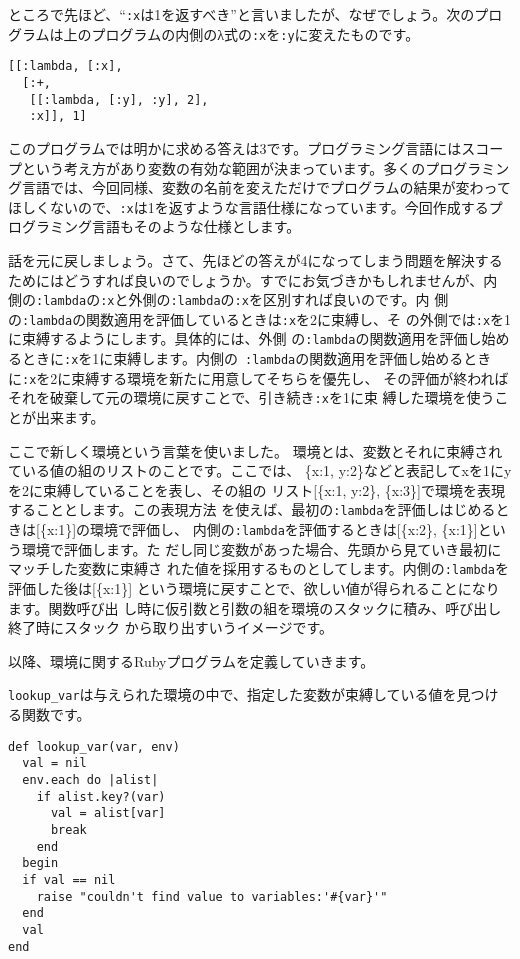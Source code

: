 ところで先ほど、“{\tt :x}は1を返すべき”と言いましたが、なぜでしょう。次のプログラムは上のプログラムの内側のλ式の{\tt :x}を{\tt :y}に変えたものです。

\begin{lstlisting}
[[:lambda, [:x],
  [:+, 
   [[:lambda, [:y], :y], 2],
   :x]], 1]
\end{lstlisting}

このプログラムでは明かに求める答えは3です。プログラミング言語にはスコープという考え方があり変数の有効な範囲が決まっています。多くのプログラミング言語では、今回同様、変数の名前を変えただけでプログラムの結果が変わってほしくないので、{\tt :x}は1を返すような言語仕様になっています。今回作成するプログラミング言語もそのような仕様とします。

話を元に戻しましょう。さて、先ほどの答えが4になってしまう問題を解決する
ためにはどうすれば良いのでしょうか。すでにお気づきかもしれませんが、内
側の{\tt :lambda}の{\tt :x}と外側の{\tt :lambda}の{\tt :x}を区別すれば良いのです。内
側の{\tt :lambda}の関数適用を評価しているときは{\tt :x}を2に束縛し、そ
の外側では{\tt :x}を1に束縛するようにします。具体的には、外側
の{\tt :lambda}の関数適用を評価し始めるときに{\tt :x}を1に束縛します。内側の{\tt
:lambda}の関数適用を評価し始めるときに{\tt :x}を2に束縛する環境を新たに用意してそちらを優先し、
その評価が終わればそれを破棄して元の環境に戻すことで、引き続き{\tt :x}を1に束
縛した環境を使うことが出来ます。

ここで新しく環境という言葉を使いました。
環境とは、変数とそれに束縛されている値の組のリストのことです。ここでは、
\{x:1, y:2\}などと表記してxを1にyを2に束縛していることを表し、その組の
リスト[\{x:1, y:2\}, \{x:3\}]で環境を表現することとします。この表現方法
を使えば、最初の{\tt :lambda}を評価しはじめるときは[\{x:1\}]の環境で評価し、
内側の{\tt :lambda}を評価するときは[\{x:2\}, \{x:1\}]という環境で評価します。た
だし同じ変数があった場合、先頭から見ていき最初にマッチした変数に束縛さ
れた値を採用するものとしてします。内側の{\tt :lambda}を評価した後は[\{x:1\}]
という環境に戻すことで、欲しい値が得られることになります。関数呼び出
し時に仮引数と引数の組を環境のスタックに積み、呼び出し終了時にスタック
から取り出すいうイメージです。

以降、環境に関するRubyプログラムを定義していきます。

{\tt lookup\_var}は与えられた環境の中で、指定した変数が束縛している値を見つける関数です。

\begin{lstlisting}
def lookup_var(var, env)
  val = nil
  env.each do |alist|  
    if alist.key?(var)
      val = alist[var]
      break 
    end
  begin
  if val == nil
    raise "couldn't find value to variables:'#{var}'"
  end
  val
end  
\end{lstlisting}

